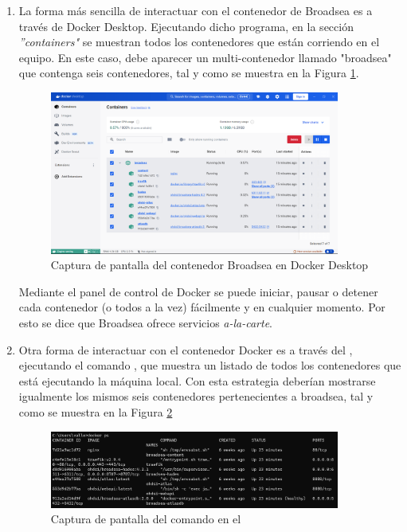 \begin{enumerate} 

    \item La forma más sencilla de interactuar con el contenedor de Broadsea es a través de Docker Desktop. Ejecutando dicho programa, en la sección \textit{''containers"} se muestran todos los contenedores que están corriendo en el equipo. En este caso, debe aparecer un multi-contenedor llamado "broadsea" que contenga seis contenedores, tal y como se muestra en la Figura \ref{fig:dockerDesktop}.
    
\begin{figure}[H]
    \centering
    \includegraphics[width=0.90\textwidth]{figures/dockerDesktop.png}
    \caption{Captura de pantalla del contenedor Broadsea en Docker Desktop}
    \label{fig:dockerDesktop}
\end{figure}

    Mediante el panel de control de Docker se puede iniciar, pausar o detener cada contenedor (o todos a la vez) fácilmente y en cualquier momento. Por esto se dice que Broadsea ofrece servicios \textit{a-la-carte}.

    \item Otra forma de interactuar con el contenedor Docker es a través del , ejecutando el comando , que muestra un listado de todos los contenedores que está ejecutando la máquina local. Con esta estrategia deberían mostrarse igualmente los mismos seis contenedores pertenecientes a broadsea, tal y como se muestra en la Figura \ref{fig:dockerCMD}

\begin{figure}[H]
    \centering
    \includegraphics[width=0.90\textwidth]{figures/dockerCMD.png}
    \caption{Captura de pantalla del comando  en el }
    \label{fig:dockerCMD}
\end{figure}
    

\end{enumerate}
